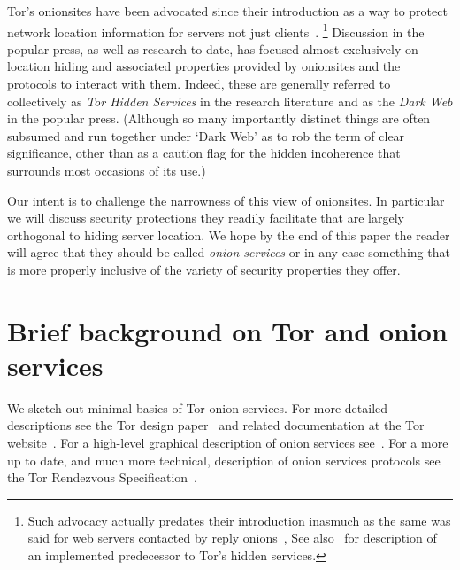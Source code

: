\documentclass[10pt, conference, compsocconf]{styles/IEEEtran}
\begin{document}

Tor's onionsites have been advocated since their introduction as a
way to protect network location information for servers not just
clients~\cite{tor-design}. \footnote{Such advocacy actually predates
  their introduction inasmuch as the same was said for web servers
  contacted by reply onions~\cite{onion-routing:cacm99}, See
  also~\cite{rewebber} for description of an implemented predecessor
  to Tor's hidden services.}  Discussion in the popular press, as well
as research to date, has focused almost exclusively on location hiding
and associated properties provided by onionsites and the protocols
to interact with them. Indeed, these are generally referred to
collectively as \emph{Tor Hidden Services} in the research literature
and as the \emph{Dark Web} in the popular press. (Although so many
importantly distinct things are often subsumed and run together under
`Dark Web' as to rob the term of clear significance, other than as a
caution flag for the hidden incoherence that surrounds
most occasions of its use.)

Our intent is to challenge the narrowness of this view of
onionsites. In particular we will discuss security protections they
readily facilitate that are largely orthogonal to hiding server
location. We hope by the end of this paper the reader will agree that
they should be called \emph{onion services} or in any
case something that is more properly inclusive of the variety of
security properties they offer.

\section{Brief background on Tor and onion services}

We sketch out minimal basics of Tor onion services. For more detailed
descriptions see the Tor design paper~\cite{tor-design} and related documentation at the
Tor website~\cite{torproject}. For a high-level graphical description
of onion services see~\cite{tor-hs}. For a more up to date, and much
more technical, description of onion services protocols see the Tor
Rendezvous Specification~\cite{tor-rend-spec}.
\end{document}
